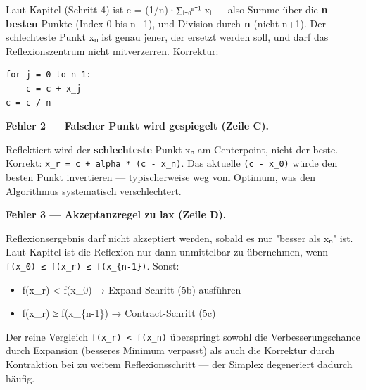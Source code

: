 \documentclass[11pt, a4paper]{article}
\begin{document}
Laut Kapitel (Schritt 4) ist c⃗ = (1/n)·∑ⱼ₌₀ⁿ⁻¹ x⃗ⱼ — also Summe über die \textbf{n besten} Punkte (Index 0 bis n−1), und Division durch \textbf{n} (nicht n+1). Der schlechteste Punkt x⃗ₙ ist genau jener, der ersetzt werden soll, und darf das Reflexionszentrum nicht mitverzerren. Korrektur:

\begin{lstlisting}
for j = 0 to n-1:
    c = c + x_j
c = c / n
\end{lstlisting}


\textbf{Fehler 2 — Falscher Punkt wird gespiegelt (Zeile C).}

Reflektiert wird der \textbf{schlechteste} Punkt x⃗ₙ am Centerpoint, nicht der beste. Korrekt: \texttt{x\_r = c + alpha * (c - x\_n)}. Das aktuelle \texttt{(c - x\_0)} würde den besten Punkt invertieren — typischerweise weg vom Optimum, was den Algorithmus systematisch verschlechtert.


\textbf{Fehler 3 — Akzeptanzregel zu lax (Zeile D).}

Reflexionsergebnis darf nicht akzeptiert werden, sobald es nur "besser als x⃗ₙ" ist. Laut Kapitel ist die Reflexion nur dann unmittelbar zu übernehmen, wenn \texttt{f(x\_0) ≤ f(x\_r) ≤ f(x\_\{n-1\})}. Sonst:

\begin{itemize}
  \item f(x\_r) < f(x\_0) → Expand-Schritt (5b) ausführen
  \item f(x\_r) ≥ f(x\_\{n-1\}) → Contract-Schritt (5c)
\end{itemize}

Der reine Vergleich \texttt{f(x\_r) < f(x\_n)} überspringt sowohl die Verbesserungschance durch Expansion (besseres Minimum verpasst) als auch die Korrektur durch Kontraktion bei zu weitem Reflexionsschritt — der Simplex degeneriert dadurch häufig.





\end{document}
